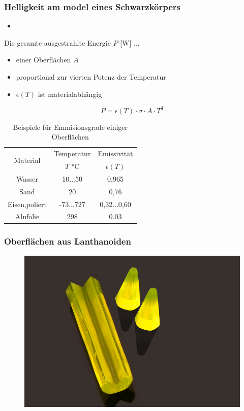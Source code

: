 \documentclass{beamer}
\begin{document}
\begin{frame}[t]\frametitle{Helligkeit am model eines Schwarzkörpers }
\begin{itemize}
  \item 
\end{itemize}

Die gesamte ausgestrahlte Energie $P$ [\si{\watt}] ...
     \begin{itemize}
     \item einer Oberflächen $A$
       \item proportional zur vierten Potenz der Temperatur
      \item  $\epsilon(T)$ ist materialabhängig
     \end{itemize}
   \begin{equation}
        P = \epsilon(T) \cdot \sigma \cdot A \cdot T^4
      \end{equation}

\begin{table}[!h]
\centering
      \begin{tabular}{ccc}
\toprule
\multirow{2}{*}{Material}&   Temperatur &  Emissivität  \\
& $T$ \si{\celsius}& $\epsilon(T)$\\
\midrule
 Wasser  & 10...50 &0,965  \\
 Sand & 20& 0,76\\
 Eisen,poliert & -73...727 & 0,32...0,60 \\
 Alufolie & 298 & 0.03 \\
\bottomrule
\end{tabular}
\caption{Beispiele für Emmisionsgrade einiger Oberflächen}
\end{table}
\end{frame}

\begin{frame}[t]\frametitle{Oberflächen aus Lanthanoiden}
    
\begin{figure}[!h]
\centering
      \includegraphics[scale=0.2]{pics/yagce.jpg}
      \caption*{\footnotesize {} }
 \end{figure}
\end{frame}
\end{document}
